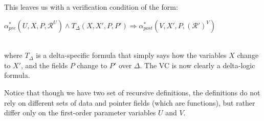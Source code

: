 This leaves us with a verification condition of the form:\\
\centerline{ $\alpha_{\textit{pre}}^*(U, X, P, \mathcal{R}^U) \wedge 
T_\Delta(X, X', P, P') \Rightarrow \alpha_{\textit{post}}^*(V, X', P, \mathcal{(R')}^V)$}\\
where $T_\Delta$ is a
delta-specific formula that simply says how the variables $X$ change to $X'$, and the fields $P$ change to $P'$ over $\Delta$.
The VC is now clearly a delta-logic formula.

Notice that though we have two set of recursive definitions, the definitions do not rely on different sets of
data and pointer fields (which are functions), but rather differ only on the first-order parameter variables $U$ 
and $V$. 

%
%

